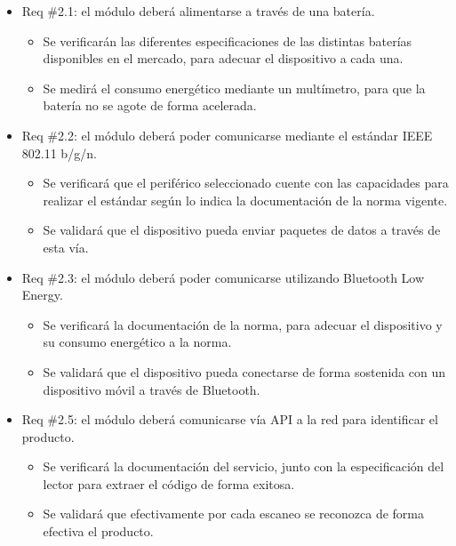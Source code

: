 \documentclass[
11pt, %
codirector, %
]{charter}
\begin{document}
\begin{itemize} 
\item Req \#2.1: el módulo deberá alimentarse a través de una batería.

\begin{itemize}
	\item Se verificarán las diferentes especificaciones de las distintas baterías disponibles en el mercado, para adecuar el dispositivo a cada una.
	\item Se medirá el consumo energético mediante un multímetro, para que la batería no se agote de forma acelerada.   
\end{itemize}


\item Req \#2.2: el módulo deberá poder comunicarse mediante el estándar IEEE 802.11 b/g/n.

\begin{itemize}
	\item Se verificará que el periférico seleccionado cuente con las capacidades para realizar el estándar según lo indica la documentación de la norma vigente.
	\item Se validará que el dispositivo pueda enviar paquetes de datos a través de esta vía.  
\end{itemize}

\item Req \#2.3: el módulo deberá poder comunicarse utilizando Bluetooth Low Energy.

\begin{itemize}
	\item Se verificará la documentación de la norma, para adecuar el dispositivo y su consumo energético a la norma.
	\item Se validará que el dispositivo pueda conectarse de forma sostenida con un dispositivo móvil a través de Bluetooth. 
\end{itemize}


\item Req \#2.5: el módulo deberá comunicarse vía API a la red para identificar el producto.

\begin{itemize}
	\item Se verificará la documentación del servicio, junto con la especificación del lector para extraer el código de forma exitosa.
	\item Se validará que efectivamente por cada escaneo se reconozca de forma efectiva el producto. 
\end{itemize}



\end{itemize}
\end{document}
